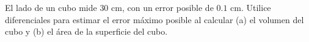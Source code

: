 \item El lado de un cubo mide $30 \text{ cm}$, con un error posible de $0.1 \text{ cm}$. Utilice diferenciales para estimar el error máximo posible al calcular (a) el volumen del cubo y (b) el área de la superficie del cubo.
